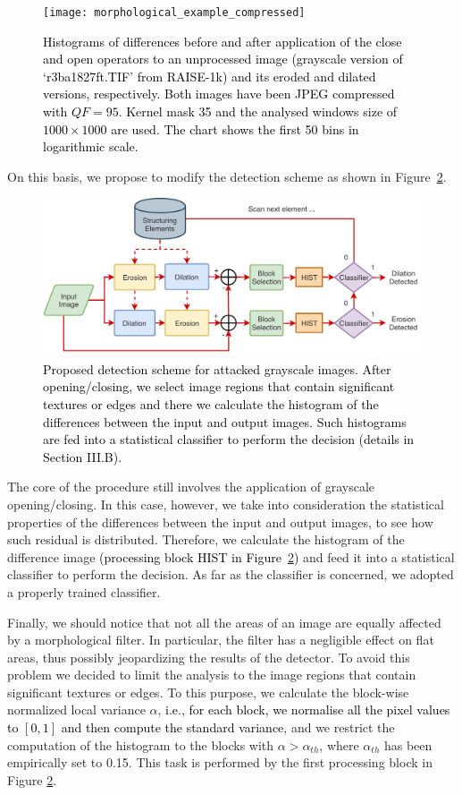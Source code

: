 \documentclass{ieeeaccess}
\newcommand{\revisedtext}[1]{\textcolor{black}{#1}}
\begin{document}
\begin{figure}[!ht]%
	\centering
	\texttt{[image: morphological\_example\_compressed]}
	\caption{\revisedtext{Histograms of differences before and after application of the close and open operators to an unprocessed image (grayscale version of `r3ba1827ft.TIF' from RAISE-1k) and its eroded and dilated versions, respectively. Both images have been JPEG compressed with $QF = 95$. Kernel mask 35 and the analysed windows size of $1000 \times 1000$ are used. The chart shows the first 50 bins in logarithmic scale. }}
	\label{fig:differerence_histogram}
\end{figure}

On this basis, we propose to modify the detection scheme as shown in Figure~\ref{fig:scheme_improved}.
\begin{figure}[!ht]
	\centering
	\includegraphics[width=0.7\linewidth]{diagram2}
	\caption{\revisedtext{Proposed detection scheme for attacked grayscale images. After opening/closing, we select image regions that contain significant textures or edges and there we calculate the histogram of the differences between the input and output images. Such histograms are fed into a statistical classifier to perform the decision (details in  Section III.B).}} 
	\label{fig:scheme_improved}
\end{figure}
The core of the procedure still involves the application of grayscale opening/closing. In this case, however, we take into consideration the statistical properties of the differences between the input and output images, to see how such residual is distributed. Therefore, we calculate the histogram of the difference image \revisedtext{(processing block HIST in Figure~\ref{fig:scheme_improved})} and feed it into a statistical classifier to perform the decision. As far as the classifier is concerned, we adopted a properly trained classifier. 

Finally, we should notice that not all the areas of an image are equally affected by a morphological filter. In particular, the filter has a negligible effect on flat areas, thus possibly jeopardizing the results of the detector. To avoid this problem we decided to limit the analysis to the image regions that contain significant textures or edges. To this purpose, we calculate the block-wise normalized local variance $\alpha$, 
%
\revisedtext{i.e., for each block, we normalise all the pixel values to $[0, 1]$ and then compute the standard variance}, and we restrict the computation of the histogram to the blocks with $\alpha > \alpha_{th}$, where $\alpha_{th}$ has been empirically set to 0.15. This task is performed by the first processing block in Figure \ref{fig:scheme_improved}. 
\end{document}
